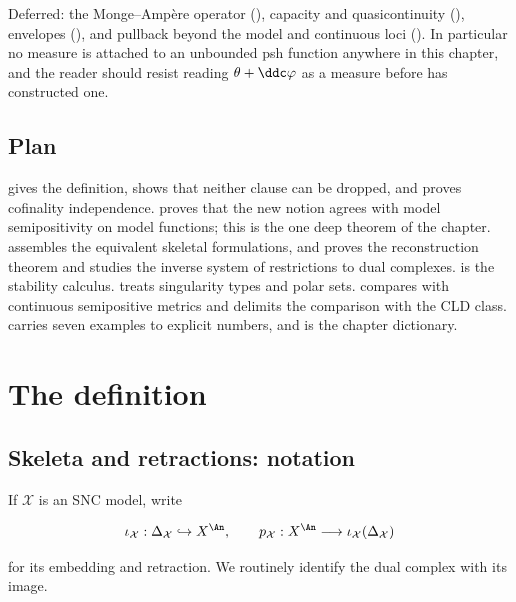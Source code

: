 Deferred: the Monge--Amp\`ere operator (), capacity and
quasicontinuity (), envelopes
(), and pullback beyond the model and continuous
loci ().  In particular no measure is attached
to an unbounded psh function anywhere in this chapter, and the reader should
resist reading $\theta+\ddc\varphi$ as a measure before
 has constructed one.

\subsection{Plan}
\label{sec:ch21-plan}

 gives the definition, shows that neither clause
can be dropped, and proves cofinality independence.
 proves that the new notion agrees with model
semipositivity on model functions; this is the one deep theorem of the
chapter.   assembles the equivalent skeletal
formulations, and  proves the reconstruction
theorem and studies the inverse system of restrictions to dual complexes.
 is the stability calculus.
 treats singularity types and polar sets.
 compares with continuous semipositive metrics and
delimits the comparison with the CLD class.   carries seven examples to explicit numbers, and
 is the chapter dictionary.

\section{The definition}
\label{sec:ch21-definition}

\subsection{Skeleta and retractions: notation}
\label{sec:ch21-notation}

If $\mathcal X$ is an SNC model, write

\begin{equation}
\label{eq:ch21-skeletal-maps}
 \iota_{\mathcal X}:\Delta_{\mathcal X}\hookrightarrow X^{\An},
 \qquad
 p_{\mathcal X}:X^{\An}\longrightarrow
       \iota_{\mathcal X}(\Delta_{\mathcal X})
\end{equation}

for its embedding and retraction.  We routinely identify the dual complex
with its image.

